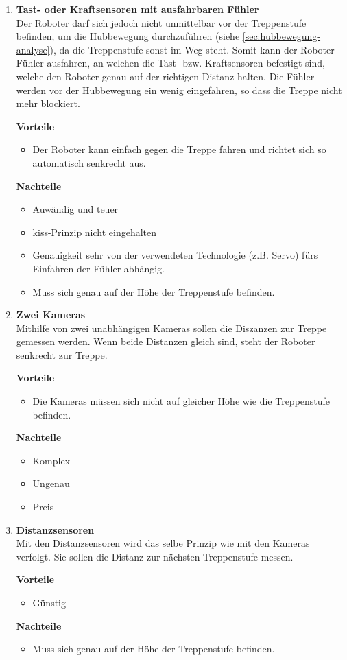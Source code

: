 \begin{enumerate}
    \item \textbf{Tast- oder Kraftsensoren mit ausfahrbaren Fühler}\\
    Der Roboter darf sich jedoch nicht unmittelbar vor der Treppenstufe befinden, um die Hubbewegung durchzuführen (siehe \ref{sec:hubbewegung-analyse}), da die Treppenstufe sonst im Weg steht. Somit kann der Roboter Fühler ausfahren, an welchen die Tast- bzw. Kraftsensoren befestigt sind, welche den Roboter genau auf der richtigen Distanz halten. Die Fühler werden vor der Hubbewegung ein wenig eingefahren, so dass die Treppe nicht mehr blockiert.
    
    \textbf{Vorteile}
    \begin{itemize}
        \item Der Roboter kann einfach gegen die Treppe fahren und richtet sich so automatisch senkrecht aus.
    \end{itemize}
    \textbf{Nachteile}
    \begin{itemize}
        \item Auwändig und teuer
        \item \acrshort{kiss}-Prinzip nicht eingehalten
        \item Genauigkeit sehr von der verwendeten Technologie (z.B. Servo) fürs Einfahren der Fühler
        abhängig. 
        \item Muss sich genau auf der Höhe der Treppenstufe befinden.
    \end{itemize}
    
    \item \textbf{Zwei Kameras}\\
    Mithilfe von zwei unabhängigen Kameras sollen die Diszanzen zur Treppe gemessen werden. Wenn beide Distanzen gleich sind, steht der Roboter senkrecht zur Treppe.
    
    \textbf{Vorteile}
    \begin{itemize}
        \item Die Kameras müssen sich nicht auf gleicher Höhe wie die Treppenstufe befinden.
    \end{itemize}
    \textbf{Nachteile}
    \begin{itemize}
        \item Komplex
        \item Ungenau
        \item Preis
    \end{itemize}
    
    \item \textbf{Distanzsensoren}\\
    Mit den Distanzsensoren wird das selbe Prinzip wie mit den Kameras verfolgt. Sie sollen die Distanz zur nächsten Treppenstufe messen.
    
    \textbf{Vorteile}
    \begin{itemize}
        \item Günstig
    \end{itemize}
    \textbf{Nachteile}
    \begin{itemize}
        \item Muss sich genau auf der Höhe der Treppenstufe befinden.
    \end{itemize}
\end{enumerate}
